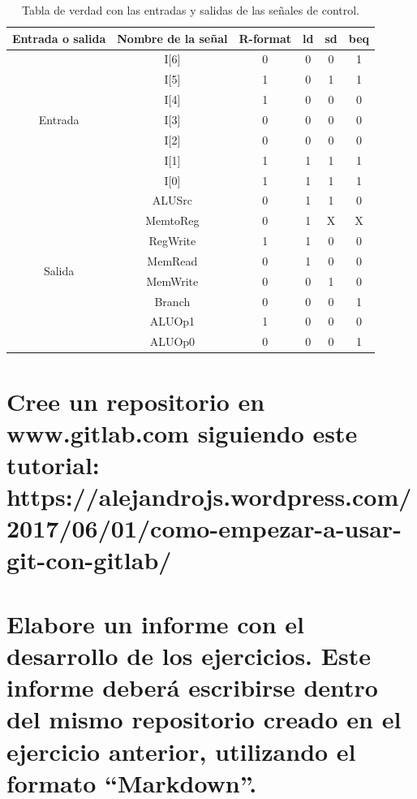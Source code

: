 \documentclass[11pt,a4paper]{article}
\begin{document}
\begin{table}[htbp]
	\centering
	  \begin{tabular}{|c|c|c|c|c|c|}
	  \hline
	  Entrada o salida & Nombre de la señal & R-format & ld & sd & beq \\
	  \hline
	  \multirow{7}{*}{Entrada} & I[6] & 0    & 0    & 0    & 1 \\
  \cline{2-6}         & I[5] & 1    & 0    & 1    & 1 \\
  \cline{2-6}         & I[4] & 1    & 0    & 0    & 0 \\
  \cline{2-6}         & I[3] & 0    & 0    & 0    & 0 \\
  \cline{2-6}         & I[2] & 0    & 0    & 0    & 0 \\
  \cline{2-6}         & I[1] & 1    & 1    & 1    & 1 \\
  \cline{2-6}         & I[0] & 1    & 1    & 1    & 1 \\
	  \hline
	\multirow{8}{*}{Salida} & ALUSrc & 0    & 1    & 1    & 0 \\
  \cline{2-6}         & MemtoReg & 0    & 1    & X & X \\
  \cline{2-6}         & RegWrite & 1    & 1    & 0    & 0 \\
  \cline{2-6}         & MemRead & 0    & 1    & 0    & 0 \\
  \cline{2-6}         & MemWrite & 0    & 0    & 1    & 0 \\
  \cline{2-6}         & Branch & 0    & 0    & 0    & 1 \\
  \cline{2-6}         & ALUOp1 & 1    & 0    & 0    & 0 \\
  \cline{2-6}         & ALUOp0 & 0    & 0    & 0    & 1 \\
	  \hline
	  \end{tabular}%
	  \caption{Tabla de verdad con las entradas y salidas de las señales de control.}
	\label{tab:addlabel}%
  \end{table}%
\section{Cree un repositorio en www.gitlab.com siguiendo este tutorial:
\small https://alejandrojs.wordpress.com/2017/06/01/como-empezar-a-usar-git-con-gitlab/}

\section{Elabore un informe con el desarrollo de los ejercicios. Este informe deberá
escribirse dentro del mismo repositorio creado en el ejercicio anterior, utilizando el
formato “Markdown”.}
\end{document}
